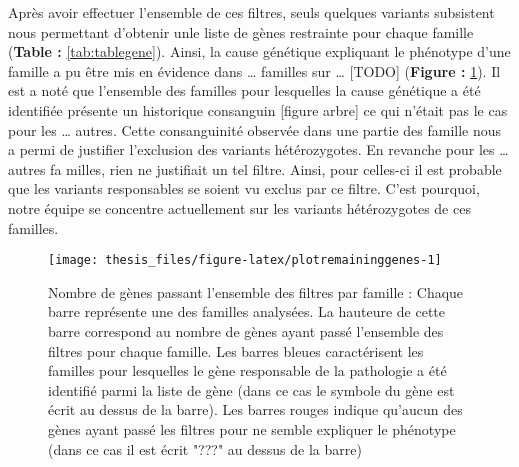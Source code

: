 \documentclass[12pt,twoside]{reedthesis}
\theoremstyle{definition}
\theoremstyle{definition}
\theoremstyle{remark}
\begin{document}
  Après avoir effectuer l'ensemble de ces filtres, seuls quelques variants
  subsistent nous permettant d'obtenir unle liste de gènes restrainte pour
  chaque famille (\textbf{Table : }\ref{tab:tablegene}). Ainsi, la cause
  génétique expliquant le phénotype d'une famille a pu être mis en
  évidence dans \ldots{} familles sur \ldots{} {[}TODO{]} (\textbf{Figure
  : }\ref{fig:plotremaininggenes}). Il est a noté que l'ensemble des
  familles pour lesquelles la cause génétique a été identifiée présente un
  historique consanguin {[}figure arbre{]} ce qui n'était pas le cas pour
  les \ldots{} autres. Cette consanguinité observée dans une partie des
  famille nous a permi de justifier l'exclusion des variants
  hétérozygotes. En revanche pour les \ldots{} autres fa milles, rien ne
  justifiait un tel filtre. Ainsi, pour celles-ci il est probable que les
  variants responsables se soient vu exclus par ce filtre. C'est pourquoi,
  notre équipe se concentre actuellement sur les variants hétérozygotes de
  ces familles.
  
  \begin{figure}
  
  {\centering \texttt{[image: thesis\_files/figure-latex/plotremaininggenes-1]} 
  
  }
  
  \caption[Nombre de gènes passant l'ensemble des filtres par famille]{Nombre de gènes passant l'ensemble des filtres par famille  :  Chaque barre représente une des familles analysées. La hauteure de cette barre correspond au nombre de gènes ayant passé l'ensemble des filtres pour chaque famille. Les barres bleues caractérisent les familles pour lesquelles le gène responsable de la pathologie a été identifié parmi la liste de gène (dans ce cas le symbole du gène est écrit au dessus de la barre). Les barres rouges indique qu'aucun des gènes ayant passé les filtres pour ne semble expliquer le phénotype (dans ce cas il est écrit "???" au dessus de la barre)}\label{fig:plotremaininggenes}
  \end{figure}
  
\end{document}
